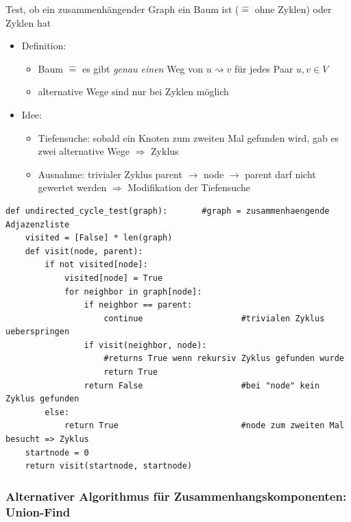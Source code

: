 \documentclass[11pt, fleqn]{scrreprt}
\begin{document}
            Test, ob ein zusammenhängender Graph ein Baum ist ($\widehat{=}$ ohne Zyklen) oder Zyklen hat
            \begin{itemize}
            \item Definition:
            \begin{itemize}
            \item Baum $\widehat{=}$ es gibt \emph{genau einen} Weg von $u \rightsquigarrow v$ für jedes Paar $u, v \in V$
            \item alternative Wege sind nur bei Zyklen möglich
            \end{itemize}
            \item Idee:
            \begin{itemize}
            \item Tiefensuche: sobald ein Knoten zum zweiten Mal gefunden wird, gab es zwei alternative Wege $\Rightarrow$ Zyklus
            \item Ausnahme: trivialer Zyklus parent $\rightarrow$ node $\rightarrow$ parent darf nicht gewertet werden $\Rightarrow$ Modifikation der Tiefensuche
            \end{itemize}
            \end{itemize}

            \begin{verbatim}
def undirected_cycle_test(graph):       #graph = zusammenhaengende Adjazenzliste
    visited = [False] * len(graph)
    def visit(node, parent):
        if not visited[node]:
            visited[node] = True
            for neighbor in graph[node]:
                if neighbor == parent:
                    continue                    #trivialen Zyklus ueberspringen
                if visit(neighbor, node):
                    #returns True wenn rekursiv Zyklus gefunden wurde
                    return True
                return False                    #bei "node" kein Zyklus gefunden
        else:
            return True                         #node zum zweiten Mal besucht => Zyklus
    startnode = 0
    return visit(startnode, startnode)
            \end{verbatim}

        \subsubsection*{Alternativer Algorithmus für Zusammenhangskomponenten: Union-Find}
\end{document}
